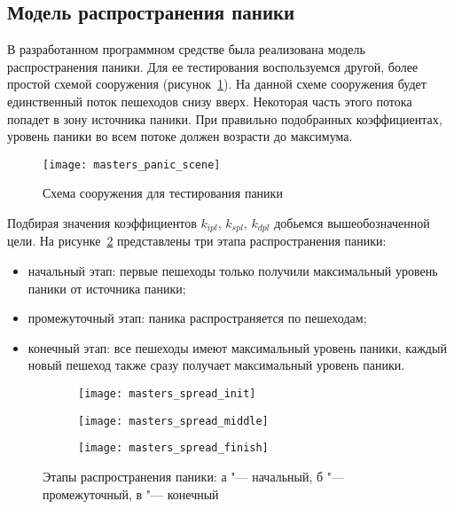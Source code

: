 \subsection{Модель распространения паники}
\label{sec:results:panic_spread}

В разработанном программном средстве была реализована модель распространения паники.
Для ее тестирования воспользуемся другой, более простой схемой сооружения (рисунок~\ref{sec:results:panic_spread:scene}).
На данной схеме сооружения будет единственный поток пешеходов снизу вверх. Некоторая часть этого потока попадет в зону источника паники.
При правильно подобранных коэффициентах, уровень паники во всем потоке должен возрасти до максимума.

\begin{figure}[ht!]
  \centering
  \texttt{[image: masters\_panic\_scene]}
  \caption{Схема сооружения для тестирования паники}
  \label{sec:results:panic_spread:scene}
\end{figure}

Подбирая значения коэффициентов $k_{ipl}$, $k_{spl}$, $k_{dpl}$ добьемся вышеобозначенной цели.
На рисунке~\ref{sec:results:panic_spread:ks} представлены три этапа распространения паники:

\begin{itemize}
  \item начальный этап: первые пешеходы только получили максимальный уровень паники от источника паники;
  \item промежуточный этап: паника распространяется по пешеходам;
  \item конечный этап: все пешеходы имеют максимальный уровень паники, каждый новый пешеход также сразу получает максимальный уровень паники.
\end{itemize}

\begin{figure}[ht!]
  \centering
  \begin{subfigure}[!htb]{0.3\textwidth}
    \centering
    \texttt{[image: masters\_spread\_init]}
    \caption{}
  \end{subfigure}
  \begin{subfigure}[!htb]{0.3\textwidth}
    \centering
    \texttt{[image: masters\_spread\_middle]}
    \caption{}
  \end{subfigure}
  \begin{subfigure}[!htb]{0.3\textwidth}
    \centering
    \texttt{[image: masters\_spread\_finish]}
    \caption{}
  \end{subfigure}
  \caption{Этапы распространения паники: а "--- начальный, б "--- промежуточный, в "--- конечный}
  \label{sec:results:panic_spread:ks}
\end{figure}

